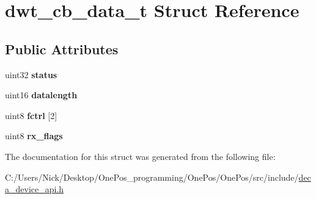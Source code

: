 \hypertarget{structdwt__cb__data__t}{\section{dwt\-\_\-cb\-\_\-data\-\_\-t Struct Reference}
\label{structdwt__cb__data__t}
}
\subsection*{Public Attributes}
\begin{DoxyCompactItemize}
\item 
\hypertarget{structdwt__cb__data__t_a5493eecb73ac390ba7cf716a1ac24b2e}{uint32 {\bfseries status}}\label{structdwt__cb__data__t_a5493eecb73ac390ba7cf716a1ac24b2e}

\item 
\hypertarget{structdwt__cb__data__t_a861a277bcec4ea98a8388fa2d4f182e6}{uint16 {\bfseries datalength}}\label{structdwt__cb__data__t_a861a277bcec4ea98a8388fa2d4f182e6}

\item 
\hypertarget{structdwt__cb__data__t_ac685ff211cd881375bed64610039d5c9}{uint8 {\bfseries fctrl} \mbox{[}2\mbox{]}}\label{structdwt__cb__data__t_ac685ff211cd881375bed64610039d5c9}

\item 
\hypertarget{structdwt__cb__data__t_ae213b0a7000b793c1979d8dc6c1f4fd8}{uint8 {\bfseries rx\-\_\-flags}}\label{structdwt__cb__data__t_ae213b0a7000b793c1979d8dc6c1f4fd8}

\end{DoxyCompactItemize}


The documentation for this struct was generated from the following file\-:\begin{DoxyCompactItemize}
\item 
C\-:/\-Users/\-Nick/\-Desktop/\-One\-Pos\-\_\-programming/\-One\-Pos/\-One\-Pos/src/include/\hyperlink{deca__device__api_8h}{deca\-\_\-device\-\_\-api.\-h}\end{DoxyCompactItemize}
